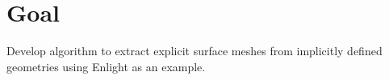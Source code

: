 
\section{Goal}

Develop algorithm to extract explicit surface meshes from implicitly defined geometries using Enlight as an example.


